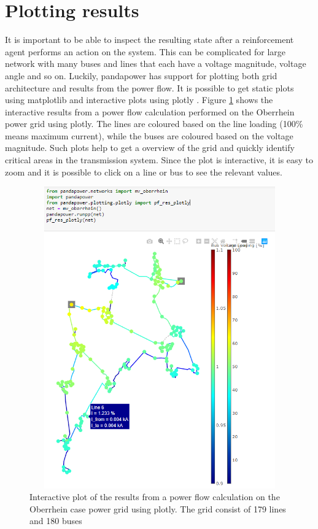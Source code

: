 \documentclass[class=book, crop=false]{standalone}
\begin{document}
\section{Plotting results}
It is important to be able to inspect the resulting state after a reinforcement agent performs an action on the system. This can be complicated for large network with many buses and lines that each have a voltage magnitude, voltage angle and so on. Luckily, pandapower has support for plotting both grid architecture and results from the power flow. It is possible to get static plots using matplotlib and interactive plots using plotly \cite{plotly}. Figure \ref{fig:method:oberrhein_grid_results_plotly} shows the interactive results from a power flow calculation performed on the Oberrhein power grid using plotly. The lines are coloured based on the line loading (100\% means maximum current), while the buses are coloured based on the voltage magnitude. Such plots help to get a overview of the grid and quickly identify critical areas in the transmission system. Since the plot is interactive, it is easy to zoom and it is possible to click on a line or bus to see the relevant values. 


\begin{figure}[H]
    \center
    \includegraphics[height=13cm, width=12cm]{figures/results_pp_oberrhein.png}
    \caption[size = 9]{Interactive plot of the results from a power flow calculation on the Oberrhein case power grid using plotly. The grid consist of 179 lines and 180 buses}
    \label{fig:method:oberrhein_grid_results_plotly}
\end{figure}
\end{document}
